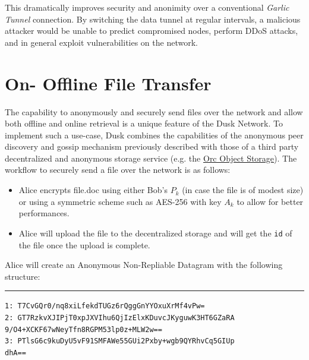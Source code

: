 This dramatically improves security and anonimity over
a conventional \emph{Garlic Tunnel} connection. By switching the data
tunnel at regular intervals, a malicious attacker would be unable to
predict compromised nodes, perform DDoS attacks, and in general exploit
vulnerabilities on the network.

\section{On- Offline File Transfer}

The capability to anonymously and securely send files over the network and allow both offline and online retrieval is a unique feature of the \textrm{Dusk} Network. To implement such a use-case, \textrm{Dusk} combines the capabilities of the anonymous peer discovery and gossip mechanism previously described with those of a third party decentralized and anonymous storage service (e.g. the \href{https://orc.network/}{Orc Object Storage}). The workflow to securely send a file over the network is as follows:

\begin{itemize}
\item Alice encrypts file.doc using either Bob's \(P_k\) (in case the file is of modest size) or using a symmetric scheme such as AES-256 with key \(A_k\) to allow for better performances.
\item Alice will upload the file to the decentralized storage and will get the \texttt{id} of the file once the upload is complete. 
\end{itemize}

Alice will create an Anonymous Non-Repliable Datagram with the following structure:

\begin{center}\rule{0.5\linewidth}{\linethickness}\end{center}

\texttt{1:\ T7CvGQr0/nq8xiLfekdTUGz6rQggGnYYOxuXrMf4vPw=}\\
\texttt{2:\ GT7RzkvXJIPjT0xpJXVIhu6QjIzElxKDuvcJKyguwK3HT6GZaRA\\9/O4+XCKF67wNeyTfn8RGPM53lp0z+MLW2w==}\\
\texttt{3:\
PTlsG6c9kuDyU5vF91SMFAWe55GUi2Pxby+wgb9QYRhvCq5GIUp\\
dhA==} 

